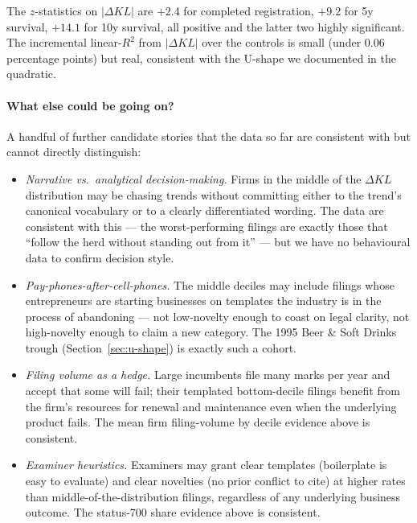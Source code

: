 \documentclass[11pt]{article}
\begin{document}
\begin{table}[h]
\centering
\caption{Single-predictor regression on $|\Delta KL|$ (the
absolute distance from $\Delta KL = 0$).}
\label{tab:abs-dkl}

\end{table}

The $z$-statistics on $|\Delta KL|$ are $+2.4$ for completed
registration, $+9.2$ for 5y survival, $+14.1$ for 10y survival,
all positive and the latter two highly significant. The
incremental linear-$R^2$ from $|\Delta KL|$ over the controls is
small (under $0.06$ percentage points) but real, consistent with
the U-shape we documented in the quadratic.

\paragraph{What else could be going on?}
A handful of further candidate stories that the data so far
are consistent with but cannot directly distinguish:

\begin{itemize}
  \item \emph{Narrative vs.\ analytical decision-making.} Firms
        in the middle of the $\Delta KL$ distribution may be
        chasing trends without committing either to the trend's
        canonical vocabulary or to a clearly differentiated
        wording. The data are consistent with this --- the
        worst-performing filings are exactly those that ``follow
        the herd without standing out from it'' --- but we have
        no behavioural data to confirm decision style.
  \item \emph{Pay-phones-after-cell-phones.} The middle deciles
        may include filings whose entrepreneurs are starting
        businesses on templates the industry is in the process
        of abandoning --- not low-novelty enough to coast on
        legal clarity, not high-novelty enough to claim a new
        category. The 1995 Beer \& Soft Drinks trough
        (Section~\ref{sec:u-shape}) is exactly such a cohort.
  \item \emph{Filing volume as a hedge.} Large incumbents file
        many marks per year and accept that some will fail;
        their templated bottom-decile filings benefit from the
        firm's resources for renewal and maintenance even when
        the underlying product fails. The mean firm filing-volume
        by decile evidence above is consistent.
  \item \emph{Examiner heuristics.} Examiners may grant clear
        templates (boilerplate is easy to evaluate) and clear
        novelties (no prior conflict to cite) at higher rates
        than middle-of-the-distribution filings, regardless of
        any underlying business outcome. The status-700 share
        evidence above is consistent.
\end{itemize}
\end{document}
